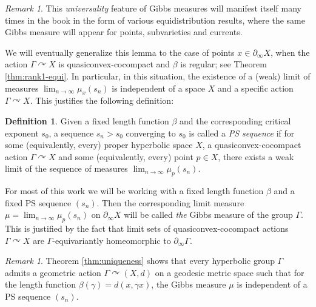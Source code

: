 \documentclass[12pt]{amsbook}%
\theoremstyle{definition}
\newtheorem{defi}[thm]{Definition}
\theoremstyle{remark}
\newtheorem{rem}[thm]{Remark}
\numberwithin{section}{chapter}
\numberwithin{subsection}{section}
\numberwithin{figure}{chapter}
\DeclareMathOperator{\acts}{\curvearrowright}
\def\Ga{\Gamma}
\def\ga{\gamma}
\def\geo{\partial_\infty}
\begin{document}
{{\begin{rem}

This {\em universality} feature of Gibbs measures will manifest itself many times in the book in the form of various equidistribution results, where the same Gibbs measure will appear for points, subvarieties and currents. 
\end{rem}

We will eventually generalize this lemma to the case of points $x\in \geo X$, when the action $\Ga\acts X$ is quasiconvex-cocompact and $\beta$ is regular; see Theorem \ref{thm:rank1-equi}. In particular, in this situation, the existence of a (weak) limit of measures $\lim_{n\to\infty}\mu_x(s_n)$ is independent of a space $X$ and a specific action $\Ga\acts X$. 
This justifies the following definition:

\begin{defi} 
Given a fixed length function $\beta$ and the corresponding critical exponent $s_0$, a sequence $s_n>s_0$ converging to $s_0$ is called a {\em PS sequence} if for some (equivalently, every) proper hyperbolic space $X$, a  quasiconvex-cocompact action $\Ga\acts X$ and some (equivalently, every) point $p\in X$,%
there exists a weak limit of the sequence of measures  
$\lim_{n\to\infty}\mu_p(s_n)$. 
\end{defi}

For most of this work we will be working with a fixed length function $\beta$ and a fixed PS sequence $(s_n)$. Then the corresponding 
limit measure $\mu=\lim_{n\to\infty}\mu_p(s_n)$ on $\geo X$ will be called {\em the} Gibbs measure of the group $\Gamma$. This 
is justified by the fact that limit sets of  quasiconvex-cocompact actions $\Ga\acts X$ are $\Gamma$-equivariantly homeomorphic to 
$\geo \Ga$. 

\begin{rem}
Theorem \ref{thm:uniqueness} shows that every hyperbolic group $\Ga$ admits a geometric action $\Ga\acts (X,d)$ on a geodesic 
metric space such that for the length function $\beta(\ga)=d(x, \ga x)$, the Gibbs measure $\mu$ is independent of a PS sequence $(s_n)$. 
\end{rem}


}}
\end{document}

